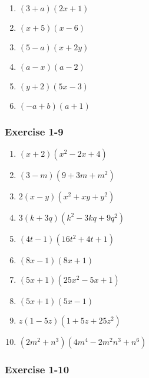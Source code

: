 {\begin{multicols}{3}
\begin{enumerate}[noitemsep, label=\textbf{\arabic*}. ] 
\item $(3 + a)(2x + 1)$%
\item $(x + 5)(x - 6)$%
\item $(5 - a)(x + 2y)$%
\item $(a - x)(a - 2)$%
\item $(y + 2)(5x - 3)$%
\item $(-a + b)(a + 1)$%
\end{enumerate}


\subsubsection*{Exercise 1-9} %



\begin{enumerate}[noitemsep, label=\textbf{\arabic*}. ] 
\item $(x + 2)(x^2 - 2x + 4)$%
\item $(3 - m)(9 + 3m + m^2)$%
\item $2(x - y)(x^2 + xy + y^2)$%
\item $3(k + 3q)(k^2 - 3kq + 9q^2)$%
\item $(4t - 1)(16t^2 + 4t + 1)$%
\item $(8x - 1)(8x + 1)$%
\item $(5x + 1)(25x^2 - 5x + 1)$%
\item $(5x + 1)(5x - 1)$%
\item $z(1 - 5z)(1 + 5z + 25z^2)$%
\item $(2m^2 + n^3)(4m^4 - 2m^2n^3 + n^6)$%
\end{enumerate}



\subsubsection*{Exercise 1-10} %




\end{multicols}}
